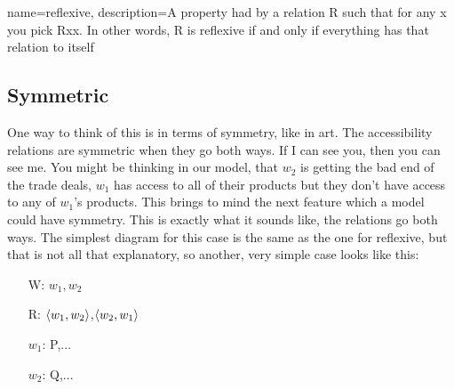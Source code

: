  
{
name=reflexive,
description={A property had by a relation R such that for any x you pick Rxx. In other words, R is reflexive if and only if everything has that relation to itself}
}
\subsection{Symmetric}

One way to think of this is in terms of symmetry, like in art. The accessibility relations are \gls{symmetric} when they go both ways. If I can see you, then you can see me. You might be thinking in our model, that $w_2$ is getting the bad end of the trade deals, $w_1$ has access to all of their products but they don't have access to any of $w_1$'s products. This brings to mind the next feature which a model could have symmetry. This is exactly what it sounds like, the relations go both ways. The simplest diagram for this case is the same as the one for reflexive, but that is not all that explanatory, so another, very simple case looks like this:

\begin{center}
\end{center}
\begin{itemize}
\item[W:] $w_1,w_2$
\item[R:]$\langle w_1,w_2\rangle$,$\langle w_2,w_1\rangle$  
\item[$w_1$:] P,...
\item[$w_2$:] Q,...
\end{itemize}


